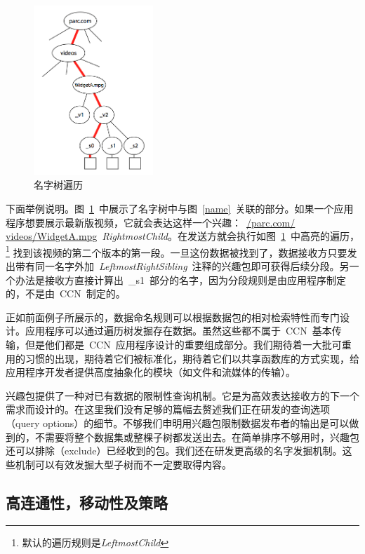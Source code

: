 \begin{figure}[htbp]
  \centering
  \includegraphics[width=0.4\textwidth]{images/name_tree}
  \caption{名字树遍历} 
  \label{name_tree}
\end{figure}

下面举例说明。图~\ref{name_tree}~中展示了名字树中与图~\ref{name}~关联的部分。如果一个应用程序想要展示最新版视频，它就会表达这样一个兴趣：~\url{/parc.com/ videos/WidgetA.mpg}~\emph{RightmostChild}。在发送方就会执行如图~\ref{name_tree}~中高亮的遍历，
\renewcommand\baselinestretch{1} %
\footnote{默认的遍历规则是\emph{LeftmostChild}}
找到该视频的第二个版本的第一段。一旦这份数据被找到了，数据接收方只要发出带有同一名字外加~\emph{LeftmostRightSibling}~注释的兴趣包即可获得后续分段。另一个办法是接收方直接计算出~\_s1~部分的名字，因为分段规则是由应用程序制定的，不是由~CCN~制定的。

正如前面例子所展示的，数据命名规则可以根据数据包的相对检索特性而专门设计。应用程序可以通过遍历树发掘存在数据。虽然这些都不属于~CCN~基本传输，但是他们都是~CCN~应用程序设计的重要组成部分。我们期待着一大批可重用的习惯的出现，期待着它们被标准化，期待着它们以共享函数库的方式实现，给应用程序开发者提供高度抽象化的模块（如文件和流媒体的传输）。

兴趣包提供了一种对已有数据的限制性查询机制。它是为高效表达接收方的下一个需求而设计的。在这里我们没有足够的篇幅去赘述我们正在研发的查询选项（query options）的细节。不够我们申明用兴趣包限制数据发布者的输出是可以做到的，不需要将整个数据集或整棵子树都发送出去。在简单排序不够用时，兴趣包还可以排除（exclude）已经收到的包。我们还在研发更高级的名字发掘机制。这些机制可以有效发掘大型子树而不一定要取得内容。

\subsection{高连通性，移动性及策略}
\label{sec:3.3}

